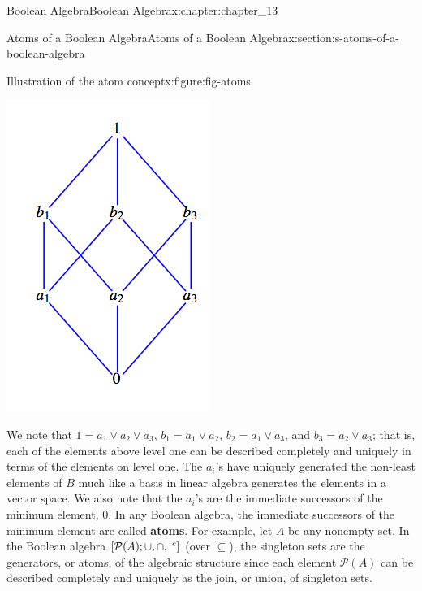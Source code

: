 \documentclass[oneside,10pt,]{book}
\newcommand{\terminology}[1]{\textbf{#1}}
\numberwithin{equation}{section}
\begin{document}
\begin{chapterptx}{Boolean Algebra}{}{Boolean Algebra}{}{}{x:chapter:chapter_13}
\begin{sectionptx}{Atoms of a Boolean Algebra}{}{Atoms of a Boolean Algebra}{}{}{x:section:s-atoms-of-a-boolean-algebra}
\begin{figureptx}{Illustration of the atom concept}{x:figure:fig-atoms}{}
\begin{image}{0.25}{0.5}{0.25}
\includegraphics[width=\linewidth]{images/fig-atoms.png}
\end{image}%
\tcblower
\end{figureptx}%
We note that \(1 = a_1 \lor  a_2 \lor  a_3\), \(b_1 = a_1 \lor  a_2\), \(b_2 = a_1 \lor  a_3\), and \(b_3 = a_2 \lor  a_3\); that is, each of the elements above level one can be described completely and uniquely in terms of the elements on level one. The \(a_i\)'s have uniquely generated the non-least elements of \(B\) much like a basis in linear algebra generates the elements in a vector space. We also note that the \(a_i\)'s are the immediate successors of the minimum element, 0. In any Boolean algebra, the immediate successors of the minimum element are called \terminology{atoms}.  For example, let \(A\) be any nonempty set. In the Boolean algebra \([\mathcal{P}(A); \cup , \cap, \hspace{1 mm}^c]\) (over \(\subseteq\)), the singleton sets are the generators, or atoms, of the algebraic structure since each element \(\mathcal{P}(A)\) can be described completely and uniquely as the join, or union, of singleton sets.%

\end{sectionptx}
\end{chapterptx}
\end{document}
